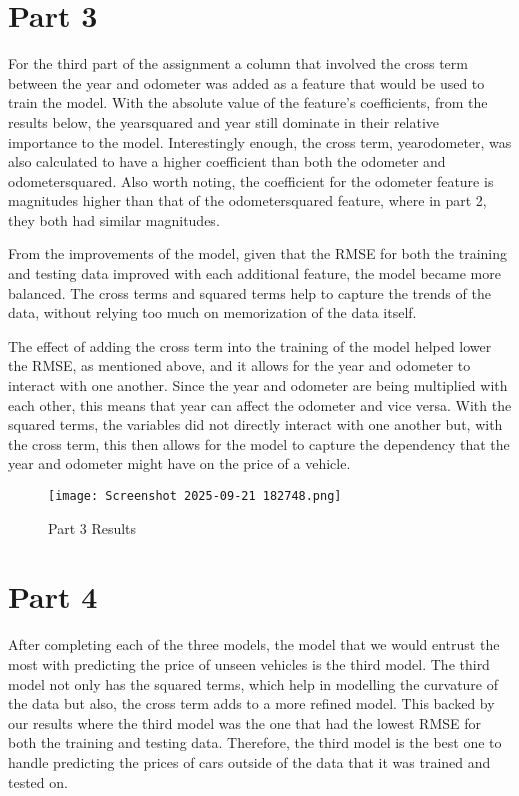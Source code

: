 \documentclass[12pt]{article}
\begin{document}
\section*{Part 3}
For the third part of the assignment a column that involved the cross term between the year and odometer was added as a feature that would be used to train the model. With the absolute value of the feature’s coefficients, from the results below, the year\textunderscore squared and year still dominate in their relative importance to the model. Interestingly enough, the cross term, year\textunderscore odometer, was also calculated to have a higher coefficient than both the odometer and odometer\textunderscore squared. Also worth noting, the coefficient for the odometer feature is magnitudes higher than that of the odometer\textunderscore squared feature, where in part 2, they both had similar magnitudes. 

From the improvements of the model, given that the RMSE for both the training and testing data improved with each additional feature, the model became more balanced. The cross terms and squared terms help to capture the trends of the data, without relying too much on memorization of the data itself. 

The effect of adding the cross term into the training of the model helped lower the RMSE, as mentioned above, and it allows for the year and odometer to interact with one another. Since the year and odometer are being multiplied with each other, this means that year can affect the odometer and vice versa. With the squared terms, the variables did not directly interact with one another but, with the cross term, this then allows for the model to capture the dependency that the year and odometer might have on the price of a vehicle. 
\begin{figure}[h]
    \centering
    \texttt{[image: Screenshot 2025-09-21 182748.png]}
    \caption{Part 3 Results}
    \label{fig:placeholder}
\end{figure}
\section*{Part 4}
After completing each of the three models, the model that we would entrust the most with predicting the price of unseen vehicles is the third model. The third model not only has the squared terms, which help in modelling the curvature of the data but also, the cross term adds to a more refined model. This backed by our results where the third model was the one that had the lowest RMSE for both the training and testing data. Therefore, the third model is the best one to handle predicting the prices of cars outside of the data that it was trained and tested on. 
\end{document}
